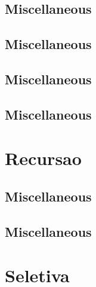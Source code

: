 \subsection{Miscellaneous}
\raggedbottom
\vspace{-.7\baselineskip}\hrulefill
\vspace{0.1\baselineskip}\subsection{Miscellaneous}
\raggedbottom
\vspace{-.7\baselineskip}\hrulefill
\vspace{0.1\baselineskip}\subsection{Miscellaneous}
\raggedbottom
\vspace{-.7\baselineskip}\hrulefill
\vspace{0.1\baselineskip}\subsection{Miscellaneous}
\raggedbottom
\vspace{-.7\baselineskip}\hrulefill
\vspace{0.1\baselineskip}
\section{Recursao}
\subsection{Miscellaneous}
\raggedbottom
\vspace{-.7\baselineskip}\hrulefill
\vspace{0.1\baselineskip}\subsection{Miscellaneous}
\raggedbottom
\vspace{-.7\baselineskip}\hrulefill
\vspace{0.1\baselineskip}
\section{Seletiva}
